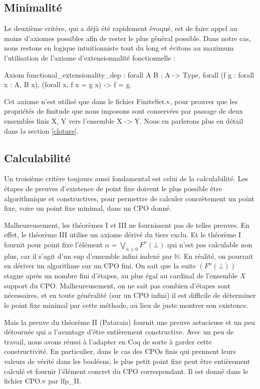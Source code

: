 \documentclass{article}
\newcommand\code[1]{{\fontfamily{lmtt}\selectfont #1}}
\theoremstyle{definition}
\begin{document}
\subsection{Minimalité}

Le deuxième critère, qui a déjà été rapidement évoqué, est de faire appel au moins d'axiomes possibles afin de rester le plus général possible. Dans notre cas, nous restons en logique intuitionniste tout du long et évitons au maximum l'utilisation de l'axiome d'extensionnalité fonctionnelle :

\label{funext}
\begin{coq}
Axiom functional_extensionality_dep : forall {A} {B : A -> Type},
  forall (f g : forall x : A, B x),
  (forall x, f x = g x) -> f = g.
\end{coq}

Cet axiome n'est utilisé que dans le fichier \code{FiniteSet.v}, pour prouver que les propriétés de finitude que nous imposons sont conservées par passage de deux ensembles finis \code{X, Y} vers l'ensemble \code{X -> Y}. Nous en parlerons plus en détail dans la section \ref{cloture}.

\subsection{Calculabilité}
\label{calculabilite}

Un troisième critère toujours aussi fondamental est celui de la calculabilité. Les étapes de preuves d'existence de point fixe doivent le plus possible être algorithmique et constructives, pour permettre de calculer concrètement un point fixe, voire un point fixe minimal, dans un CPO donné.

Malheureusement, les théorèmes I et III ne fournissent pas de telles preuves. En effet, le théorème III utilise un axiome dérivé du tiers exclu. Et le théorème I fournit pour point fixe l'élément $ \alpha = \bigvee_{n \geq 0} F^n(\bot)$ qui n'est pas calculable non plus, car il s'agit d'un sup d'ensemble infini indexé par $\mathbb{N}$. En réalité, on pourrait en dériver un algorithme sur un CPO fini. On sait que la suite $(F^n(\bot))$ stagne après un nombre fini d'étapes, au plus égal au cardinal de l'ensemble $X$ support du CPO. Malheureusement, on ne sait pas combien d'étapes sont nécessaires, et en toute généralité (sur un CPO infini) il est difficile de déterminer le point fixe minimal par cette méthode, au lieu de juste montrer son existence.

Mais la preuve du théorème II (Pataraia) fournit une preuve astucieuse et un peu détournée qui a l'avantage d'être entièrement constructive. Avec un peu de travail, nous avons réussi à l'adapter en Coq de sorte à garder cette constructivité. En particulier, dans le cas des CPOs finis qui prennent leurs valeurs de vérité dans les booléens, le plus petit point fixe peut être entièrement calculé et fournir l'élément concret du CPO correspondant. Il est donné dans le fichier \code{CPO.v} par \code{lfp\_II}. 
\end{document}

